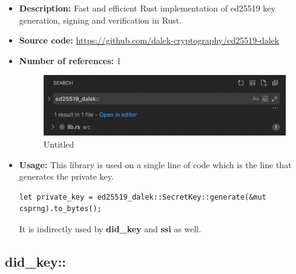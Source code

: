 \begin{itemize}
\item
  \textbf{Description:} Fast and efficient Rust implementation of
  ed25519 key generation, signing and verification in Rust.
\item
  \textbf{Source code:}
  \url{https://github.com/dalek-cryptography/ed25519-dalek}
\item
  \textbf{Number of references:} 1

  \begin{figure}
  \centering
  \includegraphics{Architecture 1442df162dbe45f4a423ba37d3e12363/Untitled 7.png}
  \caption{Untitled}
  \end{figure}
\item
  \textbf{Usage:} This library is used on a single line of code which is
  the line that generates the private key.

\begin{lstlisting}
let private_key = ed25519_dalek::SecretKey::generate(&mut csprng).to_bytes();
\end{lstlisting}

  It is indirectly used by \textbf{did\_key} and \textbf{ssi} as well.
\end{itemize}

\hypertarget{did_key}{%
\subsection{did\_key::}\label{did_key}}


